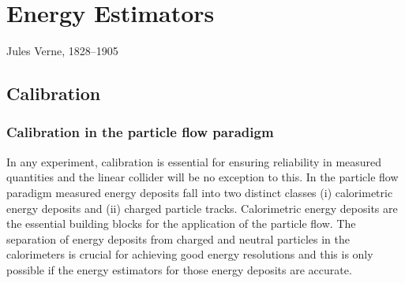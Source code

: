 \chapter{Energy Estimators}
\label{chap:energyestimators}

{Jules Verne, 1828--1905}


\section{Calibration}
\label{sec:calibration}

\subsection{Calibration in the particle flow paradigm}

In any experiment, calibration is essential for ensuring reliability in measured quantities and the linear collider will be no exception to this.  In the particle flow paradigm measured energy deposits fall into two distinct classes (i) calorimetric energy deposits and (ii) charged particle tracks.  Calorimetric energy deposits are the essential building blocks for the application of the particle flow.  The separation of energy deposits from charged and neutral particles in the calorimeters is crucial for achieving good energy resolutions and this is only possible if the energy estimators for those energy deposits are accurate.  



